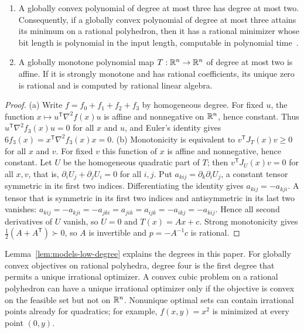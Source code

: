\begin{lemma}
\label{lem:models-low-degree}
\leavevmode
\begin{enumerate}[label=(\alph*)]
\item A globally convex polynomial of degree at most three has degree at most
  two. Consequently, if a globally convex polynomial of degree at most three
  attains its minimum on a rational polyhedron, then it has a rational
  minimizer whose bit length is polynomial in the input length, computable in
  polynomial time~\cite{KozlovTarasovKhachiyan1980}.
\item A globally monotone polynomial map $T:\mathbb R^n\to\mathbb R^n$ of degree at most
  two is affine. If it is strongly monotone and has rational coefficients, its
  unique zero is rational and is computed by rational linear algebra.
\end{enumerate}
\end{lemma}

\begin{proof}
(a) Write $f=f_0+f_1+f_2+f_3$ by homogeneous degree. For fixed $u$, the
function $x\mapsto u^{\mathsf T}\nabla^2f(x)u$ is affine and nonnegative on
$\mathbb R^n$, hence constant. Thus $u^{\mathsf T}\nabla^2f_3(x)u=0$ for all $x$ and
$u$, and Euler's identity gives $6f_3(x)=x^{\mathsf T}\nabla^2f_3(x)x=0$.
(b) Monotonicity is equivalent to $v^{\mathsf T}J_T(x)v\ge0$ for all $x$ and
$v$. For fixed $v$ this function of $x$ is affine and nonnegative, hence
constant. Let $U$ be the homogeneous quadratic part of $T$; then
$v^{\mathsf T}J_U(x)v=0$ for all $x,v$, that is,
$\partial_iU_j+\partial_jU_i=0$ for all $i,j$. Put
$a_{kij}=\partial_k\partial_iU_j$, a constant tensor symmetric in its first two
indices. Differentiating the identity gives $a_{kij}=-a_{kji}$. A tensor that
is symmetric in its first two indices and antisymmetric in its last two
vanishes:
$a_{kij}=-a_{kji}=-a_{jki}=a_{jik}=a_{ijk}=-a_{ikj}=-a_{kij}$. Hence all second
derivatives of $U$ vanish, so $U=0$ and $T(x)=Ax+c$. Strong monotonicity
gives $\frac12(A+A^{\mathsf T})\succ0$, so $A$ is invertible and
$p=-A^{-1}c$ is rational.
\end{proof}

Lemma~\ref{lem:models-low-degree} explains the degrees in this paper. For
globally convex objectives on rational polyhedra, degree four is the first
degree that permits a unique irrational optimizer. A convex cubic problem on
a rational polyhedron can have a unique irrational optimizer only if the
objective is convex on the feasible set but not on $\mathbb R^n$. Nonunique optimal
sets can contain irrational points already for quadratics; for example,
$f(x,y)=x^2$ is minimized at every point $(0,y)$.

